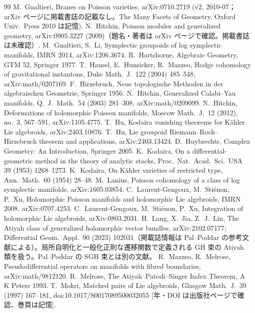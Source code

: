 \begin{thebibliography}{99}
 M.\ Gualtieri, Branes on Poisson varieties, arXiv:0710.2719 (v2, 2010-07；arXiv ページに掲載書誌の記載なし。The Many Facets of Geometry, Oxford Univ.\ Press 2010 は記憶\tQ).
 N.\ Hitchin, Poisson modules and generalized geometry, arXiv:0905.3227 (2009)（題名・著者は arXiv ページで確認。掲載書誌は未確認\tQ）.
 M.\ Gualtieri, S.\ Li, Symplectic groupoids of log symplectic manifolds, IMRN 2014, arXiv:1206.3674.
 R.\ Hartshorne, Algebraic Geometry, GTM 52, Springer 1977.
 T.\ Hausel, E.\ Hunsicker, R.\ Mazzeo, Hodge cohomology of gravitational instantons, Duke Math.\ J.\ 122 (2004) 485--548, arXiv:math/0207169.
 F.\ Hirzebruch, Neue topologische Methoden in der algebraischen Geometrie, Springer 1956.
 N.\ Hitchin, Generalized Calabi--Yau manifolds, Q.\ J.\ Math.\ 54 (2003) 281--308, arXiv:math/0209099.
 N.\ Hitchin, Deformations of holomorphic Poisson manifolds, Moscow Math.\ J.\ 12 (2012), no.\ 3, 567--591, arXiv:1105.4775.
 T.\ Hu, Kodaira vanishing theorems for K\"ahler Lie algebroids, arXiv:2403.10876.
 T.\ Hu, Lie groupoid Riemann--Roch--Hirzebruch theorem and applications, arXiv:2403.13424.
 D.\ Huybrechts, Complex Geometry: An Introduction, Springer 2005.
 K.\ Kodaira, On a differential-geometric method in the theory of analytic stacks, Proc.\ Nat.\ Acad.\ Sci.\ USA 39 (1953) 1268--1273.
 K.\ Kodaira, On K\"ahler varieties of restricted type, Ann.\ Math.\ 60 (1954) 28--48.
 M.\ Lanius, Poisson cohomology of a class of log symplectic manifolds, arXiv:1605.03854.
 C.\ Laurent-Gengoux, M.\ Sti\'enon, P.\ Xu, Holomorphic Poisson manifolds and holomorphic Lie algebroids, IMRN 2008, arXiv:0707.4253.
 C.\ Laurent-Gengoux, M.\ Sti\'enon, P.\ Xu, Integration of holomorphic Lie algebroids, arXiv:0803.2031.
 H.\ Lang, X.\ Jia, Z.\ J.\ Liu, The Atiyah class of generalized holomorphic vector bundles, arXiv:2102.07177; Differential Geom.\ Appl.\ 90 (2023) 102031（掲載誌情報は Pal--Poddar の参考文献による\tQ）。局所自明化と一般化正則な遷移関数で定義される GH 束の Atiyah 類を扱う。Pal--Poddar の SGH 束とは別の文献。
 R.\ Mazzeo, R.\ Melrose, Pseudodifferential operators on manifolds with fibred boundaries, arXiv:math/9812120.
 R.\ Melrose, The Atiyah--Patodi--Singer Index Theorem, A K Peters 1993.
 T.\ Mokri, Matched pairs of Lie algebroids, Glasgow Math.\ J.\ 39 (1997) 167--181, doi:10.1017/S0017089500032055 [年・DOI は出版社ページで確認、巻頁は記憶\tQ].

\end{thebibliography}
